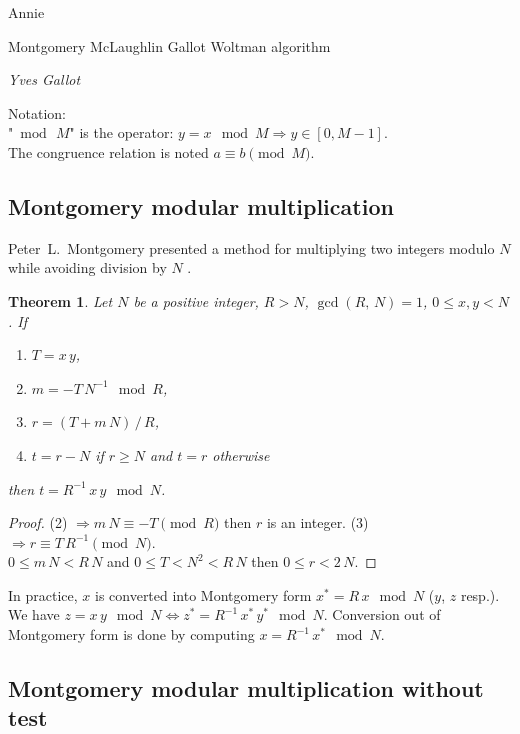 \documentclass[a4paper, 12pt, pdftex]{article}
\theoremstyle{plain}
\newtheorem{theorem}{Theorem}
\theoremstyle{definition}
\begin{document}

\begin{center}
\huge Annie
\end{center}
\begin{center}
\large Montgomery McLaughlin Gallot Woltman algorithm
\end{center}
\begin{center}
\it \large Yves Gallot
\end{center}

\bigskip
\bigskip

Notation:\\
"$\bmod\, M$" is the operator: $y = x \mod M \Rightarrow y \in [0, M - 1]$.\\
The congruence relation is noted $a \equiv b \pmod M$.

\subsection*{Montgomery modular multiplication}
Peter~L.~Montgomery presented a method for multiplying two integers modulo $N$ while avoiding division by $N$ \cite{Montgomery1}.
\begin{theorem}
Let $N$ be a positive integer, $R > N$, $\gcd(R,\, N) = 1$, $0 \leq x, y < N$. If
\begin{enumerate}[label={(\arabic*)}]
\item $T = x\,y$,
\item $m = -T\,N^{-1} \mod R$,
\item $r = (T + m\, N)\, /\, R$,
\item $t = r - N$ if $r \geq N$ and $t = r$ otherwise
\end{enumerate}
then $t = R^{-1}\, x\,y \mod N$.
\end{theorem}
\begin{proof}
(2) $\Rightarrow m\, N \equiv -T \pmod R$ then $r$ is an integer.
(3) $\Rightarrow r \equiv T\, R^{-1} \pmod N$.\\
$0 \leq m\, N < R\, N$ and $0 \leq T < N^2 < R\, N$ then $0 \leq r < 2\,N$.
\end{proof}

In practice, $x$ is converted into Montgomery form $x^* = R\, x \mod N$
($y$, $z$ resp.).\\ We have
$z = x\,y\mod N \Leftrightarrow z^*= R^{-1}\, x^*\,y^* \mod N$.
Conversion out of Montgomery form is done by computing $x = R^{-1}\, x^* \mod N$.

\subsection*{Montgomery modular multiplication without test}
\end{document}
